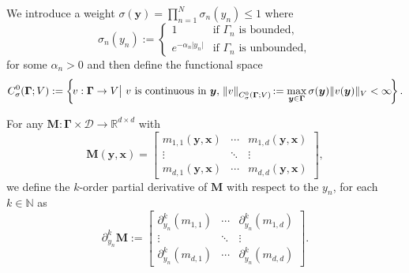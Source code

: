 \documentclass[final,onefignum,onetabnum]{mousaviart}
\begin{document}
	\vspace*{1mm}
	\begin{definition}
		We introduce a weight $\sigma(\boldsymbol{y})= \prod _{n=1}^N \sigma_n(y_n) \leq 1$ where
		\begin{equation}
			\label{ieq:sigma-weight}
			\sigma_n(y_n):=
			\begin{cases}
				1 & \text{if $\Gamma_n$ is bounded},
				\\
				e^{-\alpha_n \lvert y_n \rvert }
				& \text{if $\Gamma_n$ is unbounded},
			\end{cases}
		\end{equation}
		for some $\alpha_n>0$ and then define the functional space
		\begin{equation}
			\label{def-C-sigmma-space}
			C_\sigma^0(\boldsymbol{\Gamma}; V):=
			\left\lbrace 
			\hspace*{-0.5mm}
			v:\boldsymbol{\Gamma} \rightarrow V
			{\big \vert}~ 
			v~ \text{is continuous in } \boldsymbol{y}, 
			\hspace*{0.5mm}
			\left\| v \right\|_{C_\sigma^0(\boldsymbol{\Gamma}; V)}
			\hspace*{-0.5mm}
			:=
			\max_{\boldsymbol{y} \in \boldsymbol{\Gamma}} 
			 \sigma(\boldsymbol{y}) \lVert v(\boldsymbol{y}) \rVert_{V} 
			 < \infty
			\hspace*{-0.5mm}
			\right\rbrace.
		\end{equation}
	\end{definition}
	
	\vspace*{1mm}
		For any $\boldsymbol{M}:\boldsymbol{\Gamma} \times \mathcal{D} \rightarrow \mathbb{R}^{d \times d}$ with
		\begin{equation}
			\boldsymbol{M}(\boldsymbol{y}, \boldsymbol{x}) = 
			\begin{bmatrix}
				m_{1,1}(\boldsymbol{y}, \boldsymbol{x}) & \cdots & m_{1,d}(\boldsymbol{y}, \boldsymbol{x}) \\
				\vdots & \ddots & \vdots \\
				m_{d,1}(\boldsymbol{y}, \boldsymbol{x}) & \cdots & m_{d,d}(\boldsymbol{y}, \boldsymbol{x})
			\end{bmatrix},
		\end{equation}
		we define the $k$-order partial derivative of 
		$\boldsymbol{M}$ with respect to the $y_n$, for each $k \in \mathbb{N}$ as 
		\begin{equation}
			\label{def-partial-derveitive-matrix}
			\partial^k_{y_n} \boldsymbol{M}:= 
			\begin{bmatrix}
				\partial_{y_n}^k(m_{1,1}) & \cdots &
				\partial_{y_n}^k(m_{1,d})
				\\
				\vdots & \ddots & \vdots
				\\
				\partial_{y_n}^k(m_{d,1}) & \cdots & \partial_{y_n}^k(m_{d,d}) 
			\end{bmatrix}.
		\end{equation}
	
\end{document}
